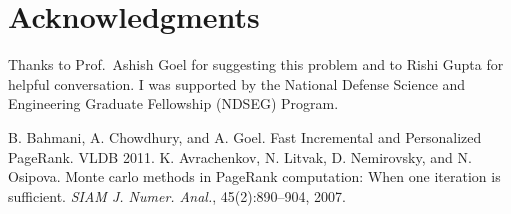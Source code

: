 \documentclass{article}
\begin{document}
\section{Acknowledgments}
Thanks to Prof.~Ashish Goel for suggesting this problem and to Rishi Gupta for helpful conversation.  I was supported by the National Defense Science and Engineering Graduate Fellowship (NDSEG) Program.

\begin{thebibliography}{9}
 B. Bahmani, A. Chowdhury, and A. Goel. Fast Incremental and Personalized PageRank.  VLDB 2011.
 K. Avrachenkov, N. Litvak, D. Nemirovsky, and
N. Osipova. Monte carlo methods in PageRank
computation: When one iteration is sufficient. \textit{SIAM
J. Numer. Anal.}, 45(2):890–904, 2007.

\end{thebibliography}
\end{document}
